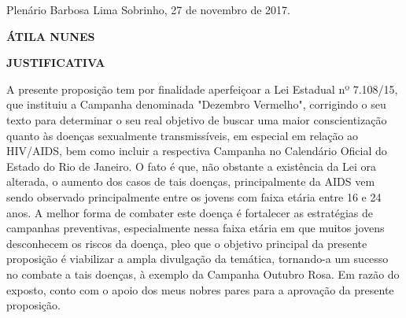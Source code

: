 \documentclass[10pt]{article}
\begin{document}
\begin{center}
  Plenário Barbosa Lima Sobrinho, 27 de novembro de 2017.

   \bigskip

  \textbf{ ÁTILA NUNES}

  \bigskip

  \textbf{JUSTIFICATIVA}
  \bigskip

\end{center}

  A presente proposição tem por finalidade aperfeiçoar a Lei Estadual nº 7.108/15, que instituiu a Campanha denominada "Dezembro Vermelho", corrigindo o seu texto para determinar o seu real objetivo de buscar uma maior conscientização quanto às doenças sexualmente transmissíveis, em especial em relação ao HIV/AIDS, bem como incluir a respectiva Campanha no Calendário Oficial do Estado do Rio de Janeiro.   O fato é que, não obstante a existência da Lei ora alterada, o aumento dos casos de tais doenças, principalmente da AIDS vem sendo observado principalmente entre os jovens com faixa etária entre 16 e 24 anos.  A melhor forma de combater este doença é fortalecer as estratégias de campanhas preventivas, especialmente nessa faixa etária em que muitos jovens desconhecem os riscos da doença, pleo que o objetivo principal da presente proposição é viabilizar a ampla divulgação da temática, tornando-a um sucesso no combate a tais doenças, à exemplo da Campanha Outubro Rosa. 
Em razão do exposto, conto com o apoio dos meus nobres pares para a aprovação da presente proposição.



\iffalse
\begin{center}
  \textbf{REFERÊNCIAS}
\end{center}


\fi
\end{document}
